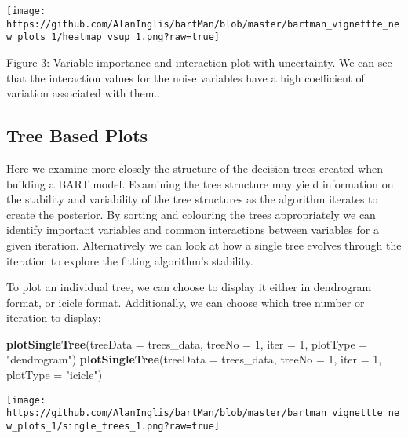 \documentclass[
]{article}
\newenvironment{Shaded}{\begin{snugshade}}{\end{snugshade}}
\newcommand{\AttributeTok}[1]{\textcolor[rgb]{0.13,0.29,0.53}{#1}}
\newcommand{\DecValTok}[1]{\textcolor[rgb]{0.00,0.00,0.81}{#1}}
\newcommand{\FunctionTok}[1]{\textcolor[rgb]{0.13,0.29,0.53}{\textbf{#1}}}
\newcommand{\NormalTok}[1]{#1}
\newcommand{\StringTok}[1]{\textcolor[rgb]{0.31,0.60,0.02}{#1}}
\begin{document}
\begin{center}\texttt{[image: https://github.com/AlanInglis/bartMan/blob/master/bartman\_vignettte\_new\_plots\_1/heatmap\_vsup\_1.png?raw=true]} \end{center}

\protect\hypertarget{fig3:fig3}{}{Figure 3: } Variable importance and
interaction plot with uncertainty. We can see that the interaction
values for the noise variables have a high coefficient of variation
associated with them..

\hypertarget{tree-based-plots}{%
\subsection{Tree Based Plots}\label{tree-based-plots}}

Here we examine more closely the structure of the decision trees created
when building a BART model. Examining the tree structure may yield
information on the stability and variability of the tree structures as
the algorithm iterates to create the posterior. By sorting and colouring
the trees appropriately we can identify important variables and common
interactions between variables for a given iteration. Alternatively we
can look at how a single tree evolves through the iteration to explore
the fitting algorithm's stability.

To plot an individual tree, we can choose to display it either in
dendrogram format, or icicle format. Additionally, we can choose which
tree number or iteration to display:

\begin{Shaded}
\begin{Highlighting}[]
\FunctionTok{plotSingleTree}\NormalTok{(}\AttributeTok{treeData =}\NormalTok{ trees\_data, }\AttributeTok{treeNo =} \DecValTok{1}\NormalTok{, }\AttributeTok{iter =} \DecValTok{1}\NormalTok{, }\AttributeTok{plotType =} \StringTok{"dendrogram"}\NormalTok{)}
\FunctionTok{plotSingleTree}\NormalTok{(}\AttributeTok{treeData =}\NormalTok{ trees\_data, }\AttributeTok{treeNo =} \DecValTok{1}\NormalTok{, }\AttributeTok{iter =} \DecValTok{1}\NormalTok{, }\AttributeTok{plotType =} \StringTok{"icicle"}\NormalTok{)}
\end{Highlighting}
\end{Shaded}

\begin{center}\texttt{[image: https://github.com/AlanInglis/bartMan/blob/master/bartman\_vignettte\_new\_plots\_1/single\_trees\_1.png?raw=true]} \end{center}
\end{document}
